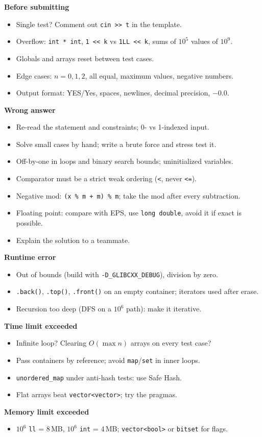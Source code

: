 {\scriptsize
\textbf{Before submitting}
\begin{itemize}
  \item Single test? Comment out \texttt{cin >{}> t} in the template.
  \item Overflow: \texttt{int * int}, \texttt{1 <{}< k} vs \texttt{1LL <{}< k}, sums of $10^5$ values of $10^9$.
  \item Globals and arrays reset between test cases.
  \item Edge cases: $n = 0, 1, 2$, all equal, maximum values, negative numbers.
  \item Output format: YES/Yes, spaces, newlines, decimal precision, $-0.0$.
\end{itemize}
\textbf{Wrong answer}
\begin{itemize}
  \item Re-read the statement and constraints; 0- vs 1-indexed input.
  \item Solve small cases by hand; write a brute force and stress test it.
  \item Off-by-one in loops and binary search bounds; uninitialized variables.
  \item Comparator must be a strict weak ordering (\texttt{<}, never \texttt{<=}).
  \item Negative mod: \texttt{(x \% m + m) \% m}; take the mod after every subtraction.
  \item Floating point: compare with EPS, use \texttt{long double}, avoid it if exact is possible.
  \item Explain the solution to a teammate.
\end{itemize}
\textbf{Runtime error}
\begin{itemize}
  \item Out of bounds (build with \texttt{-D\_GLIBCXX\_DEBUG}), division by zero.
  \item \texttt{.back()}, \texttt{.top()}, \texttt{.front()} on an empty container; iterators used after erase.
  \item Recursion too deep (DFS on a $10^6$ path): make it iterative.
\end{itemize}
\textbf{Time limit exceeded}
\begin{itemize}
  \item Infinite loop? Clearing $O(\max n)$ arrays on every test case?
  \item Pass containers by reference; avoid \texttt{map}/\texttt{set} in inner loops.
  \item \texttt{unordered\_map} under anti-hash tests: use Safe Hash.
  \item Flat arrays beat \texttt{vector<vector>}; try the pragmas.
\end{itemize}
\textbf{Memory limit exceeded}
\begin{itemize}
  \item $10^6$ \texttt{ll} = 8\,MB, $10^6$ \texttt{int} = 4\,MB; \texttt{vector<bool>} or \texttt{bitset} for flags.
\end{itemize}
\par}
